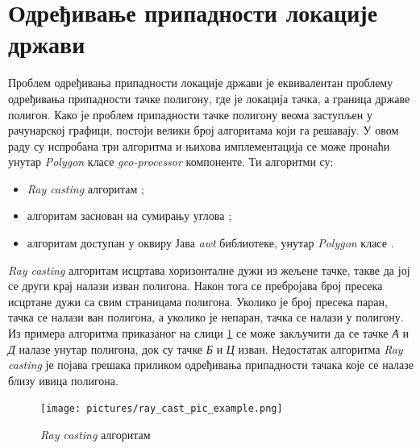 \documentclass[12pt,oneside]{memoir}
\begin{document}
\section{Одређивање припадности локације држави}
\label{sec:poly_cont}

Проблем одређивања припадности локације држави је еквивалентан проблему одређивања припадности тачке полигону, где је локација тачка, а граница државе полигон. Како је проблем припадности тачке полигону веома заступљен у рачунарској графици, постоји велики број алгоритама који га решавају. У овом раду су испробана три алгоритма и њихова имплементација се може пронаћи унутар \textit{Polygon} класе \textit{geo-processor} компоненте. Ти алгоритми су:

\begin{itemize}
	\item \textit{Ray casting} алгоритам \cite{inside_polygon};
	\item алгоритам заснован на сумирању углова \cite{inside_polygon};
	\item алгоритам доступан у оквиру Јава \textit{awt} библиотеке, унутар \textit{Polygon} класе \cite{java_awt_polygon}.
\end{itemize}


\textit{Ray casting} алгоритам исцртава хоризонталне дужи из жељене тачке, такве да јој се други крај налази изван полигона. Након тога се пребројава број пресека исцртане дужи са свим страницама полигона. Уколико је број пресека паран, тачка се налази ван полигона, а уколико је непаран, тачка се налази у полигону. Из примера алгоритма приказаног на слици \ref{fig:ray_cast_algo_example} се може закључити да се тачке \textit{А} и \textit{Д} налазе унутар полигона, док су тачке \textit{Б} и \textit{Ц} изван. Недостатак алгоритма \textit{Ray casting} је појава грешака приликом одређивања припадности тачака које се налазе близу ивица полигона. %

\begin{figure}[!ht]
  \centering
  \texttt{[image: pictures/ray\_cast\_pic\_example.png]}
  \caption{\textit{Ray casting} алгоритам}
  \label{fig:ray_cast_algo_example}
\end{figure}
\end{document}
